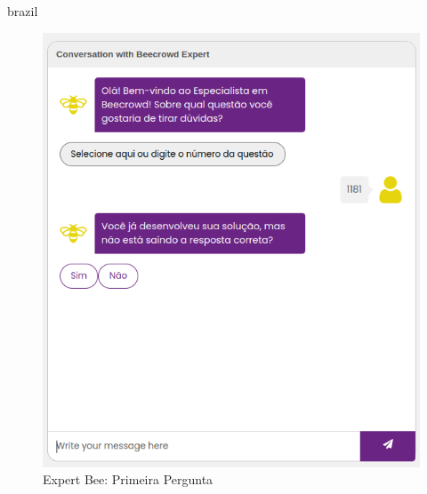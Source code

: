 \begin{otherlanguage*}{brazil}
\begin{figure}[H]
    \centering
            \caption{Expert Bee: Primeira Pergunta}
            \label{fig:ModeloConceitual}
        \includegraphics[scale=0.63]{pictures/desenvolvimento/expert_bee_primeira_pergunta.png}
\end{figure}


\end{otherlanguage*}
